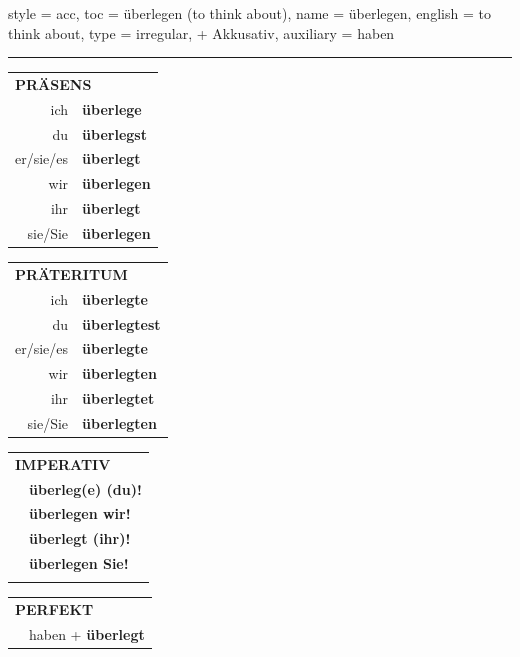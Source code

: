 \begin{verbentry}{
  style = {acc},
  toc = {überlegen (to think about)},
  name = {überlegen},
  english = {to think about},
  type = {irregular, + Akkusativ},
  auxiliary = {haben}
}
 
    
     \vspace{5pt}

    \hrule
    
    \vspace{5pt}

  \begin{tabular}{rl}
     \multicolumn{2}{l}{\textbf{PRÄSENS} }\\
    ich & \textbf{überlege}\\
    du & \textbf{überlegst}\\
    er/sie/es & \textbf{überlegt}\\
    wir & \textbf{überlegen}\\
    ihr & \textbf{überlegt}\\
    sie/Sie & \textbf{überlegen}\\
  \end{tabular}
  \hfill
     \begin{tabular}{rl}
    \multicolumn{2}{l}{\textbf{PRÄTERITUM} }\\
    ich & \textbf{überlegte}\\
    du & \textbf{überlegtest}\\
    er/sie/es & \textbf{überlegte}\\
    wir & \textbf{überlegten}\\
    ihr & \textbf{überlegtet}\\
    sie/Sie & \textbf{überlegten}\\
  \end{tabular}
  \hfill
  \begin{tabular}{rl}
     \multicolumn{2}{l}{\textbf{IMPERATIV} }\\
   & \textbf{überleg(e) (du)!}\\
   & \textbf{überlegen wir!}\\
   & \textbf{überlegt (ihr)!}\\
   & \textbf{überlegen Sie!}\\
   & \vspace{10pt}
  \end{tabular}

    \vspace{10pt}

 \begin{tabular}{rl}
     \multicolumn{2}{l}{\textbf{PERFEKT}}\\
   & haben + \textbf{überlegt}\\
  \end{tabular}
\hfill
   \begin{tabular}{rl}
   

\end{tabular}
\end{verbentry}
